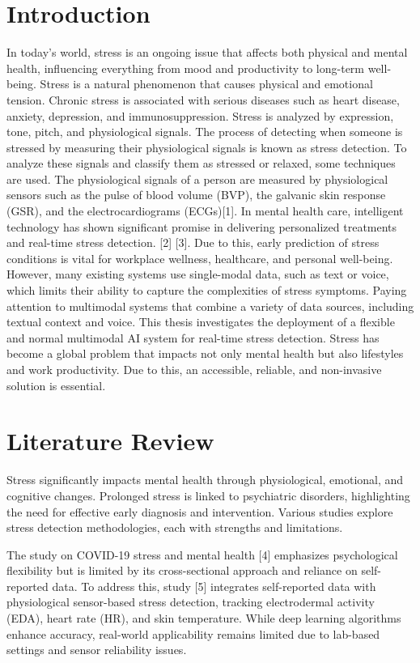 \documentclass[a4j, twocolumn]{article}
\begin{document}
\section{Introduction}
In today’s world, stress is an ongoing issue that affects both physical and mental health, influencing everything from mood and productivity to long-term well-being. Stress is a natural phenomenon that causes physical and emotional tension. Chronic stress is associated with serious diseases such as heart disease, anxiety, depression, and immunosuppression. Stress is analyzed by expression, tone, pitch, and physiological signals. The process of detecting when someone is stressed by measuring their physiological signals is known as stress detection. To analyze these signals and classify them as stressed or relaxed, some techniques are used. The physiological signals of a person are measured by physiological sensors such as the pulse of blood volume (BVP), the galvanic skin response (GSR), and the electrocardiograms (ECGs)[1]. 
In mental health care, intelligent technology has shown significant promise in delivering personalized treatments and real-time stress detection. [2] [3]. Due to this, early prediction of stress conditions is vital for workplace wellness, healthcare, and personal well-being. However, many existing systems use single-modal data, such as text or voice, which limits their ability to capture the complexities of stress symptoms. Paying attention to multimodal systems that combine a variety of data sources, including textual context and voice. This thesis investigates the deployment of a flexible and normal multimodal AI system for real-time stress detection.
Stress has become a global problem that impacts not only mental health but also lifestyles and work productivity. Due to this, an accessible, reliable, and non-invasive solution is essential.
\section{Literature Review}
Stress significantly impacts mental health through physiological, emotional, and cognitive changes. Prolonged stress is linked to psychiatric disorders, highlighting the need for effective early diagnosis and intervention. Various studies explore stress detection methodologies, each with strengths and limitations.

The study on COVID-19 stress and mental health [4] emphasizes psychological flexibility but is limited by its cross-sectional approach and reliance on self-reported data. To address this, study [5] integrates self-reported data with physiological sensor-based stress detection, tracking electrodermal activity (EDA), heart rate (HR), and skin temperature. While deep learning algorithms enhance accuracy, real-world applicability remains limited due to lab-based settings and sensor reliability issues.
\end{document}
